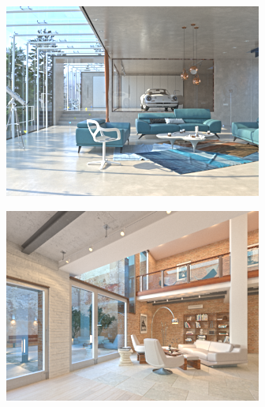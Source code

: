 \begin{figure}
  \centering
  \begin{subfigure}{0.4\linewidth}
    \includegraphics[width=\linewidth]{praca/images/Interior_mountain.png}
  \end{subfigure}
  \begin{subfigure}{0.4\linewidth}
    \includegraphics[width=\linewidth]{praca/images/AI50_001_Cam01.png}
  \end{subfigure}
  \begin{subfigure}{0.4\linewidth}

\end{subfigure}
\end{figure}
